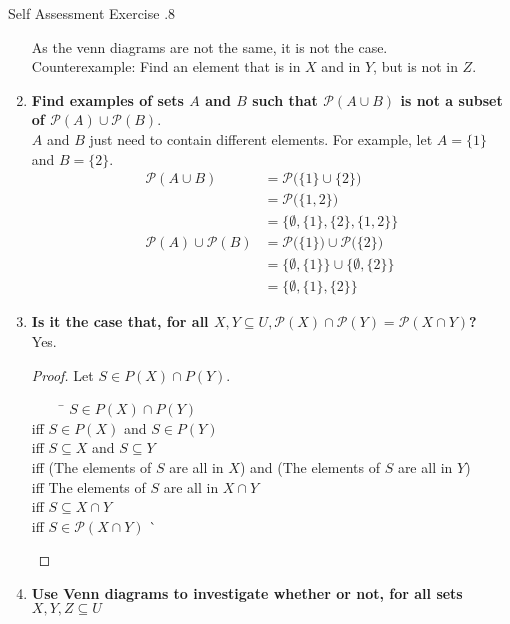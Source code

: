 \documentclass[../notes.tex]{subfiles}
\begin{document}
\begin{exercise}{Self Assessment Exercise \thechapter.8}
\begin{enumerate}
\begin{center}
\begin{vennthree}[labelA=$X$, labelB=$Y$, labelC=$Z$, tikzoptions={scale=0.8}]
						\end{vennthree}
					\end{center}
					As the venn diagrams are not the same, it is not the case.\\
					Counterexample: Find an element that is in $X$ and in $Y$, but is not in $Z$.
				\item \textbf{Find examples of sets $A$ and $B$ such that $\mathcal{P}(A \cup B)$ is not a subset of $\mathcal{P}(A) \cup \mathcal{P}(B)$}.\\
					$A$ and $B$ just need to contain different elements. For example, let $A = \{1\}$ and $B = \{2\}$.
					\begin{align*}
						\mathcal{P}(A \cup B) &= \mathcal{P}\bigl(\{1\} \cup \{2\}\bigr)\\
						&= \mathcal{P}\bigl(\{1, 2\}\bigr)\\
						&= \bigl\{\emptyset, \{1\}, \{2\}, \{1, 2\}\bigr\}\\
						\mathcal{P}(A) \cup \mathcal{P}(B) &= \mathcal{P}\bigl(\{1\}\bigr) \cup \mathcal{P}\bigl(\{2\}\bigr)\\
						&= \bigl\{\emptyset, \{1\}\bigr\} \cup \bigl\{\emptyset, \{2\}\bigr\}\\
						&= \bigl\{\emptyset, \{1\}, \{2\}\bigr\}
					\end{align*}
				\item \textbf{Is it the case that, for all $X, Y \subseteq U,\mathcal{P}(X) \cap \mathcal{P}(Y) = \mathcal{P}(X \cap Y)$?}\\
					Yes.
					\begin{proof}
						Let $S \in P(X) \cap P(Y)$.
						\begin{tabbing}
							$\qquad$ \= $S \in P(X) \cap P(Y)$\\
							iff \> $S \in P(X)$ and $S \in P(Y)$\\
							iff \> $S \subseteq X$ and $S \subseteq Y$\\
							iff \> (The elements of $S$ are all in $X$) and (The elements of $S$ are all in $Y$)\\
							iff \> The elements of $S$ are all in $X \cap Y$\\
							iff \> $S \subseteq X \cap Y$\\
							iff \> $S \in \mathcal{P}(X \cap Y)$ \` \qedhere
						\end{tabbing}
					\end{proof}
				\pagebreak
				\item \textbf{Use Venn diagrams to investigate whether or not, for all sets $X, Y, Z \subseteq U$}\\

\end{enumerate}
\end{exercise}
\end{document}

